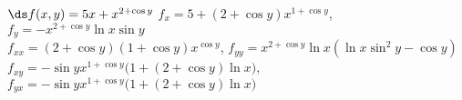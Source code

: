 {$\ds f(x,y) =5x+x^{2+\cos y}$
}
{$f_x=5+(2+\cos y) x^{1+\cos y}$, $f_y= - x^{2+\cos y} \ln x \sin y$\\
$f_{xx}=(2+\cos y)(1+\cos y) x^{\cos y}$, $f_{yy}=x^{2+\cos y}\ln x \left( \ln x \sin^2 y - \cos y\right)$\\
$f_{xy}=-\sin y x^{1+\cos y} \big( 1+ (2+\cos y) \ln x\big)$, $f_{yx}=-\sin y x^{1+\cos y} \big( 1+ (2+\cos y) \ln x\big)$\\
}